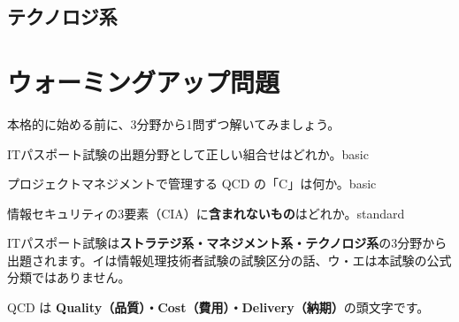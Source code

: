 \subsection*{テクノロジ系}
\begin{itemize}
\end{itemize}

\section{ウォーミングアップ問題}

本格的に始める前に、3分野から1問ずつ解いてみましょう。

\mondaipage

\begin{mondai}{ITパスポート試験の出題分野として正しい組合せはどれか。}{basic}
\end{mondai}

\begin{mondai}{プロジェクトマネジメントで管理する QCD の「C」は何か。}{basic}
\end{mondai}

\begin{mondai}{情報セキュリティの3要素（CIA）に\textbf{含まれないもの}はどれか。}{standard}
\end{mondai}

\kaitoupage

\begin{kaisetsu}
ITパスポート試験は\textbf{ストラテジ系・マネジメント系・テクノロジ系}の3分野から出題されます。イは情報処理技術者試験の試験区分の話、ウ・エは本試験の公式分類ではありません。
\end{kaisetsu}

\begin{kaisetsu}
QCD は \textbf{Quality（品質）・Cost（費用）・Delivery（納期）}の頭文字です。
\end{kaisetsu}

